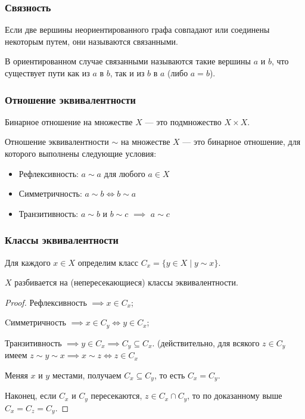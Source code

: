 \subsubsection*{Связность}

\begin{defn}
    Если две вершины неориентированного графа совпадают или соединены некоторым путем, они называются связанными.

    В ориентированном случае связанными называются такие вершины $a$ и $b$, что существует пути как из $a$ в $b$, так и из $b$ в $a$ (либо $a = b$).
\end{defn}


\subsubsection*{Отношение эквивалентности}

\begin{defn}
    Бинарное отношение на множестве $X$ --- это подмножество $X \times X$.
\end{defn}

\begin{defn}
    Отношение эквивалентности $\sim$ на множестве $X$ --- это бинарное отношение, для которого выполнены следующие условия:

    \begin{itemize}
        \item Рефлексивность: $a \sim a$ для любого $a \in X$
        \item Симметричность: $a \sim b \iff b \sim a$
        \item Транзитивность: $a \sim b$ и $b \sim c$ $\implies$ $a \sim c$
    \end{itemize}
\end{defn}

\subsubsection*{Классы эквивалентности}

Для каждого $x \in X$ определим класс $C_x = \{y \in X \mid y \sim x\}$.

\begin{theorem-non}
    $X$ разбивается на (непересекающиеся) классы эквивалентности.
\end{theorem-non}

\begin{proof}

    Рефлексивность $\implies x \in C_x$;

    Cимметричность $\implies x \in C_y \iff y \in C_x$;

    Транзитивность $\implies y \in C_x \implies C_y \subseteq C_x$. (действительно, для всякого $z \in C_y$ имеем $z \sim y \sim x \implies x \sim z \iff z \in C_x$ 

    Меняя $x$ и $y$ местами, получаем $C_x \subseteq C_y$, то есть $C_x = C_y$.

    Наконец, если $C_x$ и $C_y$ пересекаются, $z \in C_x \cap C_y$, то по доказанному выше $C_x = C_z = C_y$.
\end{proof}

